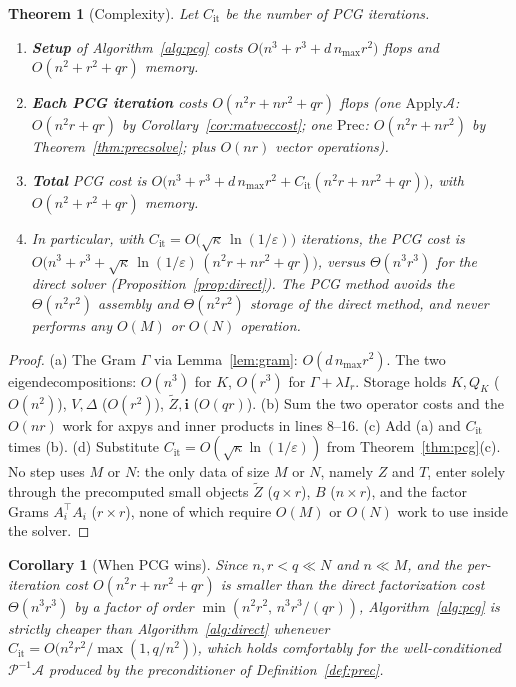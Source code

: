 \documentclass[12pt]{article}
\newtheorem{theorem}{Theorem}
\newtheorem{corollary}{Corollary}
\begin{document}
\begin{theorem}[Complexity]\label{thm:complexity}
Let $C_{\mathrm{it}}$ be the number of PCG iterations.
\begin{enumerate}[label=(\alph*)]
\item \textbf{Setup} of Algorithm~\ref{alg:pcg} costs
  $O\!\big(n^3+r^3+d\,n_{\max}r^2\big)$ flops and $O(n^2+r^2+qr)$ memory.
\item \textbf{Each PCG iteration} costs $O(n^2r+nr^2+qr)$ flops
  (one $\mathrm{Apply}\mathcal A$: $O(n^2r+qr)$ by Corollary~\ref{cor:matveccost};
  one $\mathrm{Prec}$: $O(n^2r+nr^2)$ by Theorem~\ref{thm:precsolve}; plus
  $O(nr)$ vector operations).
\item \textbf{Total} PCG cost is
  $O\!\big(n^3+r^3+d\,n_{\max}r^2+C_{\mathrm{it}}(n^2r+nr^2+qr)\big)$, with
  $O(n^2+r^2+qr)$ memory.
\item In particular, with $C_{\mathrm{it}}=O\!\big(\sqrt\kappa\,\ln(1/\varepsilon)\big)$
  iterations, the PCG cost is
  $O\!\big(n^3+r^3+\sqrt\kappa\,\ln(1/\varepsilon)\,(n^2r+nr^2+qr)\big)$,
  versus $\Theta(n^3r^3)$ for the direct solver
  (Proposition~\ref{prop:direct}). The PCG method avoids the $\Theta(n^2r^2)$
  assembly and $\Theta(n^2r^2)$ storage of the direct method, and never performs
  any $O(M)$ or $O(N)$ operation.
\end{enumerate}
\end{theorem}

\begin{proof}
(a) The Gram $\Gamma$ via Lemma~\ref{lem:gram}: $O(d\,n_{\max}r^2)$. The two
eigendecompositions: $O(n^3)$ for $K$, $O(r^3)$ for $\Gamma+\lambda I_r$. Storage
holds $K,Q_K$ ($O(n^2)$), $V,\Delta$ ($O(r^2)$), $\widetilde Z,\mathbf i$
($O(qr)$). (b) Sum the two operator costs and the $O(nr)$ work for axpys and inner
products in lines 8--16. (c) Add (a) and $C_{\mathrm{it}}$ times (b). (d)
Substitute $C_{\mathrm{it}}=O(\sqrt\kappa\ln(1/\varepsilon))$ from
Theorem~\ref{thm:pcg}(c). No step uses $M$ or $N$: the only data of size $M$ or
$N$, namely $Z$ and $T$, enter solely through the precomputed small objects
$\widetilde Z$ ($q\times r$), $B$ ($n\times r$), and the factor Grams
$A_i^{\!\top}A_i$ ($r\times r$), none of which require $O(M)$ or $O(N)$ work to use
inside the solver.
\end{proof}

\begin{corollary}[When PCG wins]
Since $n,r<q\ll N$ and $n\ll M$, and the per-iteration cost $O(n^2r+nr^2+qr)$ is
smaller than the direct factorization cost $\Theta(n^3r^3)$ by a factor of order
$\min(n^2r^2,\,n^3r^3/(qr))$, Algorithm~\ref{alg:pcg} is strictly cheaper than
Algorithm~\ref{alg:direct} whenever
$C_{\mathrm{it}}=O\!\big(n^2r^2/\max(1,q/n^2)\big)$, which holds comfortably for
the well-conditioned $\mathcal P^{-1}\mathcal A$ produced by the preconditioner of
Definition~\ref{def:prec}.
\end{corollary}
\end{document}
